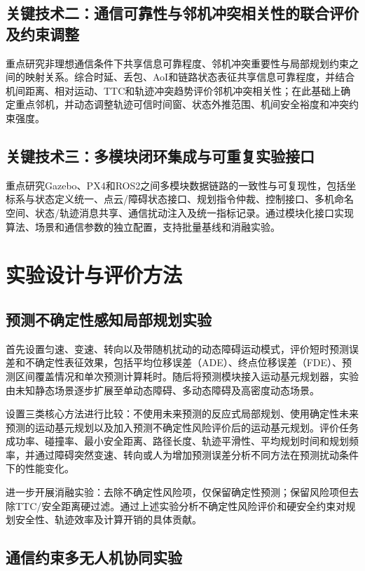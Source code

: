 \subsection{关键技术二：通信可靠性与邻机冲突相关性的联合评价及约束调整}

重点研究非理想通信条件下共享信息可靠程度、邻机冲突重要性与局部规划约束之间的映射关系。综合时延、丢包、AoI和链路状态表征共享信息可靠程度，并结合机间距离、相对运动、TTC和轨迹冲突趋势评价邻机冲突相关性；在此基础上确定重点邻机，并动态调整轨迹可信时间窗、状态外推范围、机间安全裕度和冲突约束强度。

\subsection{关键技术三：多模块闭环集成与可重复实验接口}

重点研究Gazebo、PX4和ROS2之间多模块数据链路的一致性与可复现性，包括坐标系与状态定义统一、点云/障碍状态接口、规划指令仲裁、控制接口、多机命名空间、状态/轨迹消息共享、通信扰动注入及统一指标记录。通过模块化接口实现算法、场景和通信参数的独立配置，支持批量基线和消融实验。

\section{实验设计与评价方法}

\subsection{预测不确定性感知局部规划实验}

首先设置匀速、变速、转向以及带随机扰动的动态障碍运动模式，评价短时预测误差和不确定性表征效果，包括平均位移误差（ADE）、终点位移误差（FDE）、预测区间覆盖情况和单次预测计算耗时。随后将预测模块接入运动基元规划器，实验由未知静态场景逐步扩展至单动态障碍、多动态障碍及高密度动态场景。

设置三类核心方法进行比较：不使用未来预测的反应式局部规划、使用确定性未来预测的运动基元规划以及加入预测不确定性风险评价后的运动基元规划。评价任务成功率、碰撞率、最小安全距离、路径长度、轨迹平滑性、平均规划时间和规划频率，并通过障碍突然变速、转向或人为增加预测误差分析不同方法在预测扰动条件下的性能变化。

进一步开展消融实验：去除不确定性风险项，仅保留确定性预测；保留风险项但去除TTC/安全距离硬过滤。通过上述实验分析不确定性风险评价和硬安全约束对规划安全性、轨迹效率及计算开销的具体贡献。

\subsection{通信约束多无人机协同实验}

